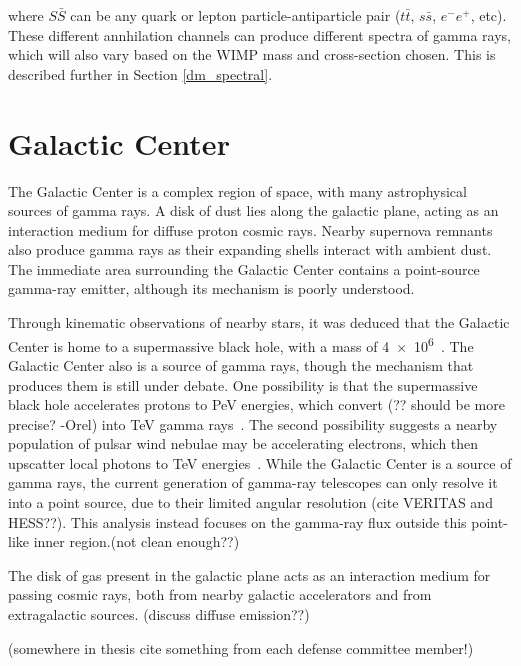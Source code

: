     where $S\bar{S}$ can be any quark or lepton particle-antiparticle pair ($t\bar{t}$, $s\bar{s}$, $e^{-}e^{+}$, etc).
    These different annhilation channels can produce different spectra of gamma rays, which will also vary based on the WIMP mass and cross-section chosen.
    This is described further in Section \ref{dm_spectral}.

\FloatBarrier

\section{Galactic Center}

  The Galactic Center is a complex region of space, with many astrophysical sources of gamma rays.
  A disk of dust lies along the galactic plane, acting as an interaction medium for diffuse proton cosmic rays.
  Nearby supernova remnants also produce gamma rays as their expanding shells interact with ambient dust.
  The immediate area surrounding the Galactic Center contains a point-source gamma-ray emitter, although its mechanism is poorly understood.

  Through kinematic observations of nearby stars, it was deduced that the Galactic Center is home to a supermassive black hole, with a mass of \SI{4e6}{\Msol}~\cite{sgra_massdist}.
  The Galactic Center also is a source of \TeV{} gamma rays, though the mechanism that produces them is still under debate.
  One possibility is that the supermassive black hole accelerates protons to PeV energies, {\color{red}which convert (?? should be more precise? -Orel)} into TeV gamma rays~\cite{gc_pevatron}.
  The second possibility suggests a nearby population of pulsar wind nebulae may be accelerating electrons, which then upscatter local photons to TeV energies~\cite{gc_pulsars}.
  While the Galactic Center is a source of gamma rays, the current generation of gamma-ray telescopes can only resolve it into a point source, due to their limited angular resolution {\color{red}(cite VERITAS and HESS??)}.
  This analysis instead focuses on the gamma-ray flux outside this point-like inner region.{\color{red}(not clean enough??)}

  The disk of gas present in the galactic plane acts as an interaction medium for passing cosmic rays, both from nearby galactic accelerators and from extragalactic sources.
  {\color{red}(discuss diffuse emission??)}

  {\color{red}(somewhere in thesis cite something from each defense committee member!)}

